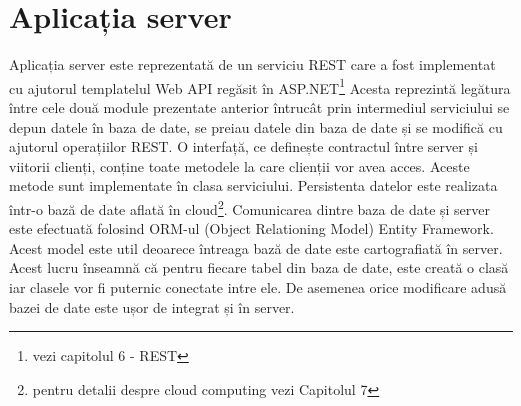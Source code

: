 \section{Aplicația server}
Aplicația server este reprezentată de un serviciu REST care a fost implementat cu ajutorul templatelul Web API regăsit în ASP.NET\footnote{vezi capitolul 6 - REST}
Acesta reprezintă legătura între cele două module prezentate anterior întrucât prin intermediul serviciului se depun datele în baza de date, se preiau datele din baza de date și se modifică cu ajutorul operațiilor REST. O interfață, ce definește contractul între server și viitorii clienți, conține toate metodele la care clienții vor avea acces. Aceste metode sunt implementate în clasa serviciului. 
Persistenta datelor este realizata într-o bază de date aflată în cloud\footnote{pentru detalii despre cloud computing vezi Capitolul 7 }. Comunicarea dintre baza de date și server este efectuată folosind ORM-ul (Object Relationing Model) Entity Framework. Acest model este util deoarece întreaga bază de date este cartografiată în server. Acest lucru înseamnă că pentru fiecare tabel din baza de date, este creată o clasă iar clasele vor fi puternic conectate intre ele. De asemenea orice modificare adusă bazei de date este ușor de integrat și în server.

